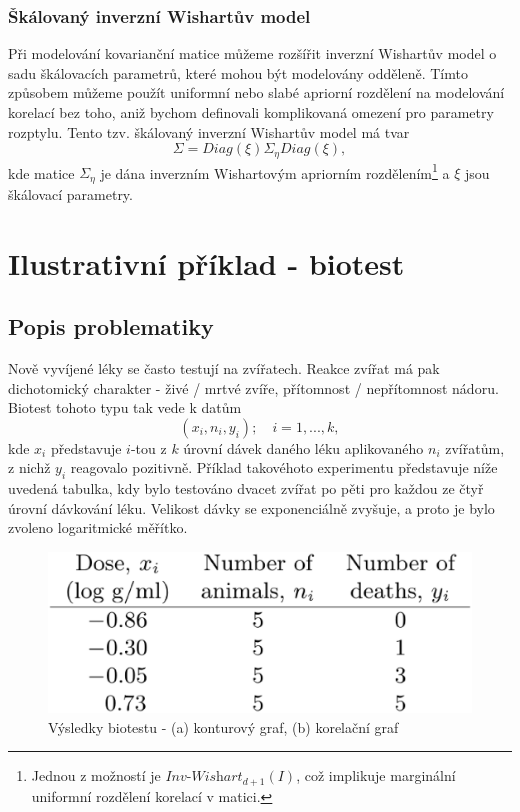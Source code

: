 \subsubsection{Škálovaný inverzní Wishartův model}

Při modelování kovarianční matice můžeme rozšířit inverzní Wishartův model o sadu škálovacích parametrů, které mohou být modelovány odděleně. Tímto způsobem můžeme použít uniformní nebo slabé apriorní rozdělení na modelování korelací bez toho, aniž bychom definovali komplikovaná omezení pro parametry rozptylu. Tento tzv. škálovaný inverzní Wishartův model má tvar
\begin{equation}
\Sigma = Diag(\xi)\Sigma_{\eta}Diag(\xi),
\end{equation}
kde matice $\Sigma_{\eta}$ je dána inverzním Wishartovým apriorním rozdělením\footnote{Jednou z možností je $\textit{Inv-Wishart}_{d + 1}(I)$, což implikuje marginální uniformní rozdělení korelací v matici.} a $\xi$ jsou škálovací parametry.

\section{Ilustrativní příklad - biotest}

\subsection{Popis problematiky}

Nově vyvíjené léky se často testují na zvířatech. Reakce zvířat má pak dichotomický charakter - živé / mrtvé zvíře, přítomnost / nepřítomnost nádoru. Biotest tohoto typu tak vede k datům
\begin{equation}
(x_i, n_i, y_i); \quad i = 1, ..., k,
\end{equation}
kde $x_i$ představuje $i$-tou z $k$ úrovní dávek daného léku aplikovaného $n_i$ zvířatům, z nichž $y_i$ reagovalo pozitivně. Příklad takovéhoto experimentu představuje níže uvedená tabulka, kdy bylo testováno dvacet zvířat po pěti pro každou ze čtyř úrovní dávkování léku. Velikost dávky se exponenciálně zvyšuje, a proto je bylo zvoleno logaritmické měřítko.
\begin{figure}[htp]
\centering
\includegraphics[scale = 0.35]{pictures/tbl_3_1.eps}
\caption{Výsledky biotestu - (a) konturový graf, (b) korelační graf}
\label{tbl_3_1}
\end{figure}

